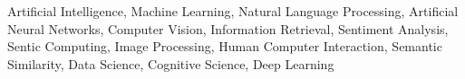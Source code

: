 {Artificial Intelligence, Machine Learning, Natural Language Processing, Artificial Neural Networks, Computer Vision,  Information Retrieval, Sentiment Analysis, Sentic Computing, Image Processing, Human Computer Interaction, Semantic Similarity, Data Science, Cognitive Science, Deep Learning}

